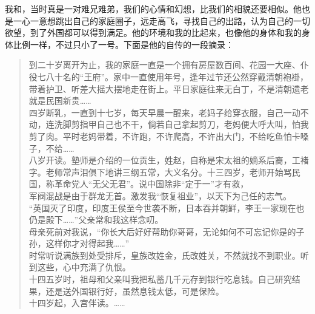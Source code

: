 我和，当时真是一对难兄难弟，我们的心情和幻想，比我们的相貌还要相似。他也是一心一意想跳出自己的家庭圈子，远走高飞，寻找自己的出路，认为自己的一切欲望，到了外国都可以得到满足。他的环境和我的比起来，也像他的身体和我的身体比例一样，不过只小了一号。下面是他的自传的一段摘录：\\

\begin{quote}
	到二十岁离开为止，我的家庭一直是一个拥有房屋数百间、花园一大座、仆役七八十名的“王府”。家中一直使用年号，逢年过节还公然穿戴清朝袍褂，带着护卫、听差大摇大摆地走在街上。平日家庭往来无白丁，不是清朝遗老就是民国新贵……\\

四岁断乳，一直到十七岁，每天早晨一醒来，老妈子给穿衣服，自己一动不动，连洗脚剪指甲自己也不干，倘若自己拿起剪刀，老妈便大呼大叫，怕我剪了肉。平时老妈带着，不许跑，不许爬高，不许出大门，不给吃鱼怕卡嗓子，不给……\\

八岁开读。塾师是介绍的一位贡生，姓赵，自称是宋太祖的嫡系后裔，工褚字。老师常声泪俱下地讲三纲五常，大义名分。十三四岁，老师开始骂民国，称革命党人“无父无君”。说中国除非“定于一”才有救，\\

军阀混战是由于群龙无首。激发我“恢复祖业”，以天下为己任的志气。\\

“英国灭了印度，印度王侯至今世袭不断，日本吞并朝鲜，李王一家现在也仍是殿下……”父亲常和我这样念叨。\\

母亲死前对我说，“你长大后好好帮助你哥哥，无论如何不可忘记你是的子孙，这样你才对得起我……”\\

时常听说满族到处受排斥，皇族改姓金，氏改姓关，不然就找不到职业。听到这些，心中充满了仇恨。\\

十四五岁时，祖母和父亲叫我把私蓄几千元存到银行吃息钱。自己研究结果，还是送外国银行好，虽然息钱太低，可是保险。\\

十四岁起，入宫伴读。……\\
\end{quote}


